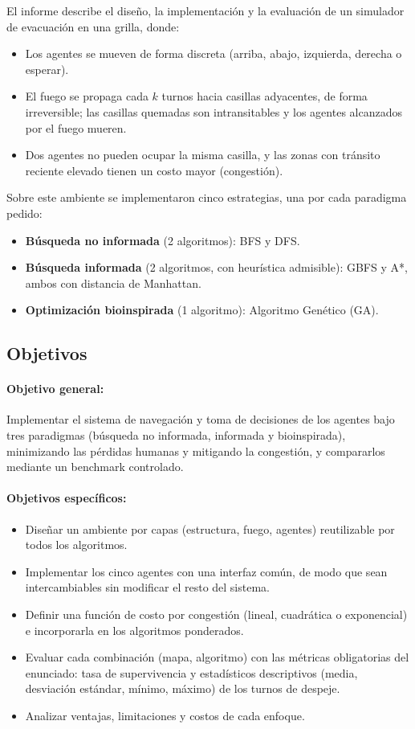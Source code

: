 \documentclass[11pt,a4paper]{article}
\begin{document}
El informe describe el diseño, la implementación y la evaluación de un simulador de evacuación en una grilla, donde:
\begin{itemize}
    \item Los agentes se mueven de forma discreta (arriba, abajo, izquierda, derecha o esperar).
    \item El fuego se propaga cada $k$ turnos hacia casillas adyacentes, de forma irreversible; las casillas quemadas son intransitables y los agentes alcanzados por el fuego mueren.
    \item Dos agentes no pueden ocupar la misma casilla, y las zonas con tránsito reciente elevado tienen un costo mayor (congestión).
\end{itemize}

Sobre este ambiente se implementaron cinco estrategias, una por cada paradigma pedido:
\begin{itemize}
    \item \textbf{Búsqueda no informada} (2 algoritmos): BFS y DFS.
    \item \textbf{Búsqueda informada} (2 algoritmos, con heurística admisible): GBFS y A*, ambos con distancia de Manhattan.
    \item \textbf{Optimización bioinspirada} (1 algoritmo): Algoritmo Genético (GA).
\end{itemize}

\subsection{Objetivos}

\paragraph{Objetivo general:}
Implementar el sistema de navegación y toma de decisiones de los agentes bajo tres paradigmas (búsqueda no informada, informada y bioinspirada), minimizando las pérdidas humanas y mitigando la congestión, y compararlos mediante un benchmark controlado.

\paragraph{Objetivos específicos:}
\begin{itemize}
    \item Diseñar un ambiente por capas (estructura, fuego, agentes) reutilizable por todos los algoritmos.
    \item Implementar los cinco agentes con una interfaz común, de modo que sean intercambiables sin modificar el resto del sistema.
    \item Definir una función de costo por congestión (lineal, cuadrática o exponencial) e incorporarla en los algoritmos ponderados.
    \item Evaluar cada combinación (mapa, algoritmo) con las métricas obligatorias del enunciado: tasa de supervivencia y estadísticos descriptivos (media, desviación estándar, mínimo, máximo) de los turnos de despeje.
    \item Analizar ventajas, limitaciones y costos de cada enfoque.
\end{itemize}
\end{document}
